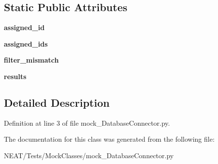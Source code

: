 \subsection*{Static Public Attributes}
\begin{DoxyCompactItemize}
\item 
{\bfseries assigned\+\_\+id}\hypertarget{class_n_e_a_t___py_genetics_1_1_n_e_a_t_1_1_tests_1_1_mock_classes_1_1mock___database_connector_1_1mock___database_connector_aaa8b3d15b7e01aef04c5ab3f58e8a006}{}\label{class_n_e_a_t___py_genetics_1_1_n_e_a_t_1_1_tests_1_1_mock_classes_1_1mock___database_connector_1_1mock___database_connector_aaa8b3d15b7e01aef04c5ab3f58e8a006}

\item 
{\bfseries assigned\+\_\+ids}\hypertarget{class_n_e_a_t___py_genetics_1_1_n_e_a_t_1_1_tests_1_1_mock_classes_1_1mock___database_connector_1_1mock___database_connector_a6061ac8abee52f8e6d81b92c24c944eb}{}\label{class_n_e_a_t___py_genetics_1_1_n_e_a_t_1_1_tests_1_1_mock_classes_1_1mock___database_connector_1_1mock___database_connector_a6061ac8abee52f8e6d81b92c24c944eb}

\item 
{\bfseries filter\+\_\+mismatch}\hypertarget{class_n_e_a_t___py_genetics_1_1_n_e_a_t_1_1_tests_1_1_mock_classes_1_1mock___database_connector_1_1mock___database_connector_a7e65d11937c1858690f2cd25ac07de18}{}\label{class_n_e_a_t___py_genetics_1_1_n_e_a_t_1_1_tests_1_1_mock_classes_1_1mock___database_connector_1_1mock___database_connector_a7e65d11937c1858690f2cd25ac07de18}

\item 
{\bfseries results}\hypertarget{class_n_e_a_t___py_genetics_1_1_n_e_a_t_1_1_tests_1_1_mock_classes_1_1mock___database_connector_1_1mock___database_connector_a3370fecdccb2abc0c0a3356825f04cc4}{}\label{class_n_e_a_t___py_genetics_1_1_n_e_a_t_1_1_tests_1_1_mock_classes_1_1mock___database_connector_1_1mock___database_connector_a3370fecdccb2abc0c0a3356825f04cc4}

\end{DoxyCompactItemize}


\subsection{Detailed Description}


Definition at line 3 of file mock\+\_\+\+Database\+Connector.\+py.



The documentation for this class was generated from the following file\+:\begin{DoxyCompactItemize}
\item 
N\+E\+A\+T/\+Tests/\+Mock\+Classes/mock\+\_\+\+Database\+Connector.\+py\end{DoxyCompactItemize}

